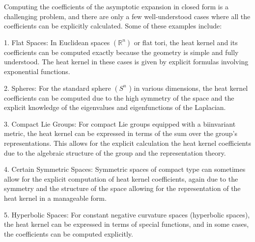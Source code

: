 \documentclass[reqno,12pt]{amsart}
\begin{document}
Computing the coefficients of the asymptotic expansion in closed form is a challenging problem, and there are only a few well-understood cases where all the coefficients can be explicitly calculated. Some of these examples include:

1. Flat Spaces: In Euclidean spaces $\left(\mathbb{R}^n\right)$ or flat tori, the heat kernel and its coefficients can be computed exactly because the geometry is simple and fully understood. The heat kernel in these cases is given by explicit formulas involving exponential functions.

2. Spheres: For the standard sphere $\left(S^n\right.$ ) in various dimensions, the heat kernel coefficients can be computed due to the high symmetry of the space and the explicit knowledge of the eigenvalues and eigenfunctions of the Laplacian.

3. Compact Lie Groups: For compact Lie groups equipped with a biinvariant metric, the heat kernel can be expressed in terms of the sum over the group's representations. This allows for the explicit calculation the heat kernel coefficients due to the algebraic structure of the group and the representation theory.

4. Certain Symmetric Spaces: Symmetric spaces of compact type can sometimes allow for the explicit computation of heat kernel coefficients, again due to the symmetry and the structure of the space allowing for the representation of the heat kernel in a manageable form.

5. Hyperbolic Spaces: For constant negative curvature spaces  (hyperbolic spaces), the heat kernel can be expressed in terms  of special functions, and in some cases, the coefficients can be computed explicitly.
\end{document}
